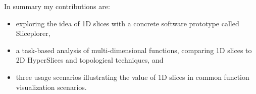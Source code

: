 In summary my contributions are: 
\begin{itemize}
\item exploring the idea of 1D slices with a concrete software prototype called Sliceplorer,
\item a task-based analysis of multi-dimensional functions, comparing 1D slices to 2D HyperSlices and topological techniques, and
\item %
three usage scenarios illustrating the value of 1D slices in common function 
      visualization scenarios. %
\end{itemize}


